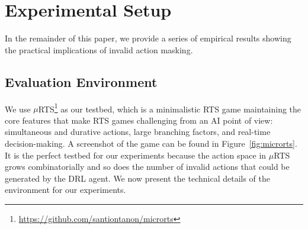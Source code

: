 \documentclass[letterpaper]{article}
\begin{document}
\section{Experimental Setup}
\label{sec:expsetup}
In the remainder of this paper, we provide a series of empirical results showing the practical implications of invalid action masking.




\subsection{Evaluation Environment}
\label{sec:evaluation_environment}
We use $\mu$RTS\footnote{\url{https://github.com/santiontanon/microrts}} as our testbed, which is a minimalistic RTS game maintaining the core features that make RTS games challenging from an AI point of view: simultaneous and durative actions, large branching factors, and real-time decision-making. A screenshot of the game can be found in Figure~\ref{fig:microrts}.
It is the perfect testbed for our experiments because the action space in $\mu$RTS grows combinatorially and so does the number of invalid actions that could be generated by the DRL agent.
We now present the technical details of the environment for our experiments.
\end{document}
